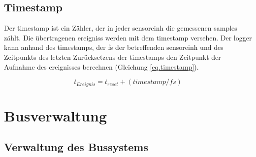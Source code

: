 \subsection{Timestamp}\label{subsec.sw_timestamp}
Der \gls{timestamp} ist ein Zähler, der in jeder \gls{sensoreinh} die gemessenen \glspl{sample} zählt. Die übertragenen \glspl{ereignis} werden mit dem \gls{timestamp} versehen. Der \gls{logger} kann anhand des \gls{timestamp}s, der \gls{fs} der betreffenden \gls{sensoreinh} und des Zeitpunkts des letzten Zurücksetzens der \gls{timestamp}s den Zeitpunkt der Aufnahme des \gls{ereignis}ses berechnen (Gleichung \ref{eq.timestamp}).

\begin{equation}\label{eq.timestamp}
t_{Ereignis} = t_{reset} + (timestamp/fs)
\end{equation}

\section{Busverwaltung}

\subsection{Verwaltung des Bussystems}\label{subsec.sw_busverwaltung}


